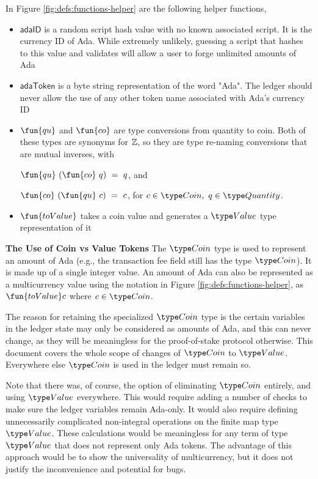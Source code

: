In Figure \ref{fig:defs:functions-helper} are the following helper functions,

\begin{itemize}
  \item $\mathsf{adaID}$ is a random script hash value with no known associated
  script. It is the currency ID of Ada. While extremely unlikely, guessing a
  script that hashes to this value
  and validates will allow a user to forge unlimited amounts of Ada
  \item $\mathsf{adaToken}$ is a byte string representation of the word "Ada".
  The ledger should never allow the use of any other token name associated
  with Ada's currency ID
  \item $\fun{qu}$ and $\fun{co}$ are type conversions from quantity to
  coin. Both of these types are synonyms for $\mathbb{Z}$, so they are
  type re-naming conversions that are mutual inverses, with

  $\fun{qu} ~(\fun{co} ~q )~= ~q$, and

  $\fun{co}~ (\fun{qu}~ c) ~=~ c$, for $c \in \Coin,~q \in \Quantity$.

  \item $\fun{toValue}$ takes a coin value and generates a $\Value$ type representation
  of it
\end{itemize}

\textbf{The Use of Coin vs Value Tokens}
The $\Coin$ type is used to represent an amount of Ada (e.g., the transaction
fee field still has the type $\Coin$). It is made up of a single
integer value. An amount of Ada can also be represented as a multicurrency value
using the notation in Figure \ref{fig:defs:functions-helper}, as
$\fun{toValue} c$ where $c \in \Coin$.

The reason for retaining the specialized $\Coin$ type is the certain variables
in the ledger state may only be considered as amounts of Ada, and this can
never change, as they will be meaningless for the proof-of-stake protocol
otherwise. This document
covers the whole scope of changes of $\Coin$ to $\Value$. Everywhere else $\Coin$
is used in the ledger must remain so.

Note that there was, of course, the option of eliminating $\Coin$ entirely,
and using $\Value$ everywhere. This would require adding a number of checks
to make sure the ledger variables remain Ada-only. It would also require
defining unnecessarily complicated non-integral operations on the finite map
type $\Value$. These calculations would be meaningless for any term of type
$\Value$ that does not represent only Ada tokens. The advantage of this approach
would be to show the universality of multicurrency, but it does not
justify the inconvenience and potential for bugs.

